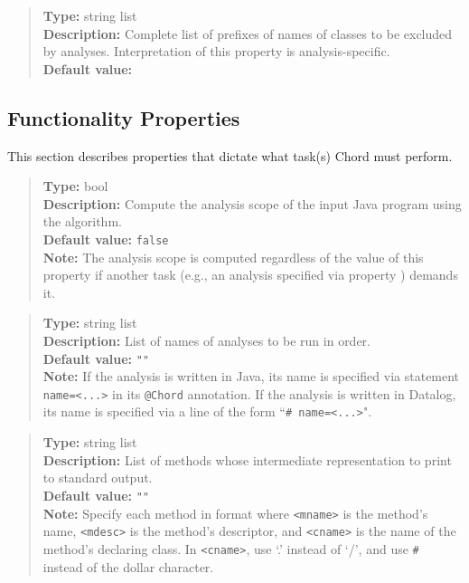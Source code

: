 \begin{quote}
{\bf Type:} string list \\
{\bf Description:} Complete list of prefixes of names of classes to be excluded by analyses.  Interpretation of this property is analysis-specific. \\
{\bf Default value:} 
\end{quote}

\subsection{Functionality Properties}
\label{sec:func-props}

This section describes properties that dictate what task(s) Chord must perform.
\\[10pt]

\begin{quote}
{\bf Type:} bool \\
{\bf Description:} Compute the analysis scope of the input Java program using the algorithm. \\
{\bf Default value:} {\tt false} \\
{\bf Note:} The analysis scope is computed regardless of the value of this property if another task (e.g., an analysis specified via property ) demands it.
\end{quote}

\begin{quote}
{\bf Type:} string list  \\
{\bf Description:} List of names of analyses to be run in order. \\
{\bf Default value:} {\tt ""} \\
{\bf Note:} If the analysis is written in Java, its name is specified via statement {\tt name=<...>} in its {\tt @Chord} annotation.  If the analysis is written in Datalog, its name is specified via a line of the form ``{\tt \# name=<...>}".
\end{quote}

\begin{quote}
{\bf Type:} string list  \\
{\bf Description:} List of methods whose intermediate representation to print to standard output. \\
{\bf Default value:} {\tt ""} \\
{\bf Note:} Specify each method in format  where {\tt <mname>} is the method's name, {\tt <mdesc>} is the method's descriptor, and {\tt <cname>} is the name of the method's declaring class. In {\tt <cname>}, use `.' instead of `/', and use {\tt \#} instead of the dollar character. 
\end{quote}

